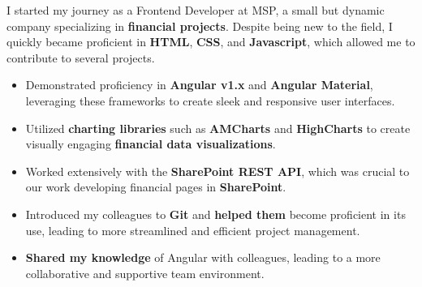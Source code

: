 \bigskip
\divider
\bigskip

I started my journey as a Frontend Developer at MSP, a small but dynamic company specializing in \textbf{financial projects}. Despite being new to the field, I quickly became proficient in \textbf{HTML}, \textbf{CSS}, and \textbf{Javascript}, which allowed me to contribute to several projects.
\medskip
\begin{itemize}
    \item Demonstrated proficiency in \textbf{Angular v1.x} and \textbf{Angular Material}, leveraging these frameworks to create sleek and responsive user interfaces.
    \item Utilized \textbf{charting libraries} such as \textbf{AMCharts} and \textbf{HighCharts} to create visually engaging \textbf{financial data visualizations}.
    \item Worked extensively with the \textbf{SharePoint REST API}, which was crucial to our work developing financial pages in \textbf{SharePoint}.
    \item Introduced my colleagues to \textbf{Git} and \textbf{helped them} become proficient in its use, leading to more streamlined and efficient project management.
    \item \textbf{Shared my knowledge} of Angular with colleagues, leading to a more collaborative and supportive team environment.
\end{itemize}
